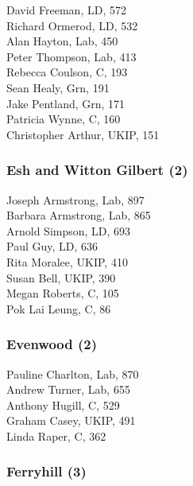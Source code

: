\documentclass[a4paper,openany,10pt]{book}
\begin{document}


David Freeman, LD, 572\\
Richard Ormerod, LD, 532\\
Alan Hayton, Lab, 450\\
Peter Thompson, Lab, 413\\
Rebecca Coulson, C, 193\\
Sean Healy, Grn, 191\\
Jake Pentland, Grn, 171\\
Patricia Wynne, C, 160\\
Christopher Arthur, UKIP, 151\\


\subsubsection*{Esh and Witton Gilbert (2)}



Joseph Armstrong, Lab, 897\\
Barbara Armstrong, Lab, 865\\
Arnold Simpson, LD, 693\\
Paul Guy, LD, 636\\
Rita Moralee, UKIP, 410\\
Susan Bell, UKIP, 390\\
Megan Roberts, C, 105\\
Pok Lai Leung, C, 86\\


\subsubsection*{Evenwood (2)}



Pauline Charlton, Lab, 870\\
Andrew Turner, Lab, 655\\
Anthony Hugill, C, 529\\
Graham Casey, UKIP, 491\\
Linda Raper, C, 362\\


\subsubsection*{Ferryhill (3)}
\end{document}
